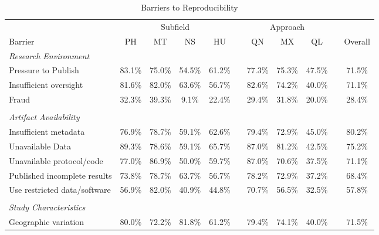 \documentclass[]{interact}
\theoremstyle{plain}%
\theoremstyle{definition}
\theoremstyle{remark}
\begin{document}
\newpage
\begin{landscape}
\begin{table}[h]
    \centering
    \begin{threeparttable}
    \caption{Barriers to Reproducibility}
    \begin{tabular}{l c c c c c c c c c c}
         \hline
                    & \multicolumn{4}{1}{Subfield}  & & \multicolumn{3}{1}{Approach} & & \\
         Barrier    & PH & MT & NS & HU            & & QN & MX & QL              & & Overall \\
         \hline
         \textit{Research Environment}      & & & & & & & & & & \\
         Pressure to Publish                & 83.1\% & 75.0\% & 54.5\% & 61.2\% & & 77.3\% & 75.3\% & 47.5\% & & 71.5\% \\
         Insufficient oversight             & 81.6\% & 82.0\% & 63.6\% & 56.7\% & & 82.6\% & 74.2\% & 40.0\% & & 71.1\% \\
         Fraud                              & 32.3\% & 39.3\% & 9.1\%  & 22.4\% & & 29.4\% & 31.8\% & 20.0\% & & 28.4\% \\
                                            & & & & & & & & & &\\
         \textit{Artifact Availability}     & & & & & & & & & & \\
         Insufficient metadata              & 76.9\% & 78.7\% & 59.1\% & 62.6\% & & 79.4\% & 72.9\% & 45.0\% & & 80.2\% \\
         Unavailable Data                   & 89.3\% & 78.6\% & 59.1\% & 65.7\% & & 87.0\% & 81.2\% & 42.5\% & & 75.2\% \\
         Unavailable protocol/code          & 77.0\% & 86.9\% & 50.0\% & 59.7\% & & 87.0\% & 70.6\% & 37.5\% & & 71.1\% \\
         Published incomplete results       & 73.8\% & 78.7\% & 63.7\% & 56.7\% & & 78.2\% & 72.9\% & 37.2\% & & 68.4\% \\
         Use restricted data/software       & 56.9\% & 82.0\% & 40.9\% & 44.8\% & & 70.7\% & 56.5\% & 32.5\% & & 57.8\% \\
                                            & & & & & & & & & &\\
         \textit{Study Characteristics}     & & & & & & & & & & \\
         Geographic variation               & 80.0\% & 72.2\% & 81.8\% & 61.2\% & & 79.4\% & 74.1\% & 40.0\% &  & 71.5\% \\

\end{tabular}
\end{threeparttable}
\end{table}
\end{landscape}
\end{document}
